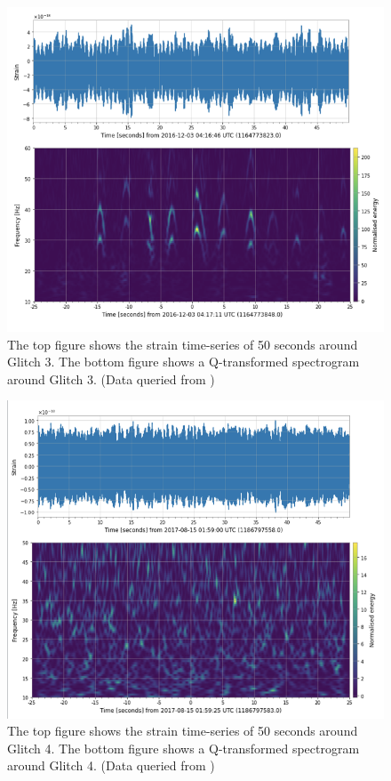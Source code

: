 \documentclass[preprint,
letterpaper,
 amsmath,amssymb,
 aps,
]{revtex4-2}
\begin{document}
\begin{figure}[t]
\caption{The top figure shows the strain time-series of 50 seconds around Glitch 3. The bottom figure shows a Q-transformed spectrogram around Glitch 3. (Data queried from \cite{collaboration2019open})}
\includegraphics[scale = .75]{Scattered Light Graphics.png}
\centering
\end{figure} 
\begin{figure}[t]
\caption{The top figure shows the strain time-series of 50 seconds around Glitch 4. The bottom figure shows a Q-transformed spectrogram around Glitch 4. (Data queried from \cite{collaboration2019open})}
\includegraphics[scale = .6]{power line graphics.png}
\centering
\end{figure} 
\end{document}
